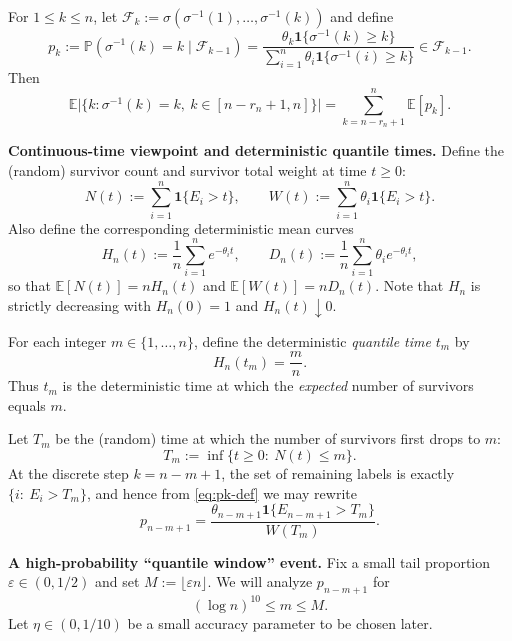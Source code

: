 \documentclass[10pt]{article}
\numberwithin{equation}{section}
\begin{document}
For $1\le k\le n$, let $\mathcal F_k:=\sigma(\sigma^{-1}(1),\dots,\sigma^{-1}(k))$ and define
\begin{equation}\label{eq:pk-def}
p_k := \mathbb P(\sigma^{-1}(k)=k \mid \mathcal F_{k-1})
     = \frac{\theta_k \mathbf 1\{\sigma^{-1}(k)\ge k\}}{\sum_{i=1}^n \theta_i \mathbf 1\{\sigma^{-1}(i)\ge k\}}
     \in \mathcal F_{k-1}.
\end{equation}
Then
\begin{equation}\label{eq:tail-exp-sum-pk}
\mathbb E\big|\{k:\sigma^{-1}(k)=k,\ k\in[n-r_n+1,n]\}\big|
= \sum_{k=n-r_n+1}^n \mathbb E[p_k].
\end{equation}

\textbf{Continuous-time viewpoint and deterministic quantile times.}
Define the (random) survivor count and survivor total weight at time $t\ge0$:
\begin{equation}\label{eq:NtWt}
N(t):=\sum_{i=1}^n \mathbf 1\{E_i>t\}, \qquad
W(t):=\sum_{i=1}^n \theta_i \mathbf 1\{E_i>t\}.
\end{equation}
Also define the corresponding deterministic mean curves
\begin{equation}\label{eq:HnDn}
H_n(t):=\frac1n\sum_{i=1}^n e^{-\theta_i t}, \qquad
D_n(t):=\frac1n\sum_{i=1}^n \theta_i e^{-\theta_i t},
\end{equation}
so that $\mathbb E[N(t)]=nH_n(t)$ and $\mathbb E[W(t)]=nD_n(t)$.
Note that $H_n$ is strictly decreasing with $H_n(0)=1$ and $H_n(t)\downarrow0$.

For each integer $m\in\{1,\dots,n\}$, define the deterministic \emph{quantile time} $t_m$ by
\begin{equation}\label{eq:tm-def}
H_n(t_m)=\frac{m}{n}.
\end{equation}
Thus $t_m$ is the deterministic time at which the \emph{expected} number of survivors equals $m$.

Let $T_m$ be the (random) time at which the number of survivors first drops to $m$:
\begin{equation}\label{eq:Tm-def}
T_m:=\inf\{t\ge0:\ N(t)\le m\}.
\end{equation}
At the discrete step $k=n-m+1$, the set of remaining labels is exactly $\{i:\ E_i>T_m\}$,
and hence from \eqref{eq:pk-def} we may rewrite
\begin{equation}\label{eq:pk-Tm}
p_{n-m+1}=\frac{\theta_{n-m+1}\mathbf 1\{E_{n-m+1}>T_m\}}{W(T_m)}.
\end{equation}


\textbf{A high-probability ``quantile window'' event.}
Fix a small tail proportion $\varepsilon\in(0,1/2)$ and set $M:=\lfloor \varepsilon n\rfloor$.
We will analyze $p_{n-m+1}$ for 
\[
(\log n)^{10}\le m\le M.
\]
Let $\eta\in(0,1/10)$ be a small accuracy parameter to be chosen later.
\end{document}
